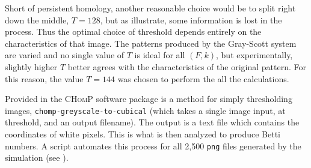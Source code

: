 
Short of persistent homology, another reasonable choice would be to split right down the middle, $T = 128$, but as  illustrate, some information is lost in the process. Thus the optimal choice of threshold depends entirely on the characteristics of that image. The patterns produced by the Gray-Scott system are varied and no single value of $T$ is ideal for all $(F, k)$, but experimentally, slightly higher $T$ better agrees with the characteristics of the original pattern. For this reason, the value $T = 144$ was chosen to perform the all the calculations.

Provided in the \textsc{CHomP} software package is a method for simply thresholding images, \texttt{chomp-greyscale-to-cubical} (which takes a single image input, at threshold, and an output filename). The output is a text file which contains the coordinates of white pixels. This is what is then analyzed to produce Betti numbers. A script automates this process for all 2,500 \texttt{png} files generated by the simulation (see ).


